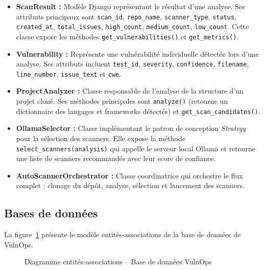 \documentclass[12pt, a4paper, oneside]{report}
\begin{document}
\begin{itemize}
    \item \textbf{ScanResult :} Modèle Django représentant le résultat d'une
    analyse. Ses attributs principaux sont \texttt{scan\_id}, \texttt{repo\_name},
    \texttt{scanner\_type}, \texttt{status}, \texttt{created\_at},
    \texttt{total\_issues}, \texttt{high\_count}, \texttt{medium\_count},
    \texttt{low\_count}. Cette classe expose les méthodes \texttt{get\_vulnerabilities()}
    et \texttt{get\_metrics()}.
    
    \item \textbf{Vulnerability :} Représente une vulnérabilité individuelle
    détectée lors d'une analyse. Ses attributs incluent \texttt{test\_id},
    \texttt{severity}, \texttt{confidence}, \texttt{filename},
    \texttt{line\_number}, \texttt{issue\_text} et \texttt{cwe}.
    
    \item \textbf{ProjectAnalyzer :} Classe responsable de l'analyse de la
    structure d'un projet cloné. Ses méthodes principales sont
    \texttt{analyze()} (retourne un dictionnaire des langages et frameworks
    détectés) et \texttt{get\_scan\_candidates()}.
    
    \item \textbf{OllamaSelector :} Classe implémentant le patron de
    conception \textit{Strategy} \cite{gof} pour la sélection des scanners.
    Elle expose la méthode \texttt{select\_scanners(analysis)} qui appelle
    le serveur local Ollama et retourne une liste de scanners recommandés avec leur
    score de confiance.
    
    \item \textbf{AutoScannerOrchestrator :} Classe coordinatrice qui orchestre
    le flux complet : clonage du dépôt, analyse, sélection et lancement des
    scanners.
\end{itemize}

\subsection{Bases de données}
\label{subsec:bdd}

La figure~\ref{fig:erd} présente le modèle entités-associations de la base
de données de VulnOps.

\begin{figure}[H]
    \centering
    \caption{Diagramme entités-associations -- Base de données VulnOps}
    \label{fig:erd}
\end{figure}
\end{document}
